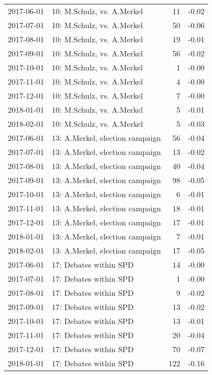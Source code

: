 \begin{adjustbox}{width=\textwidth}
\begin{tabular}{llrr}
  2017-06-01 & 10: M.Schulz, vs. A.Merkel &  11 & -0.02 \\ 
  2017-07-01 & 10: M.Schulz, vs. A.Merkel &  50 & -0.06 \\ 
  2017-08-01 & 10: M.Schulz, vs. A.Merkel &  19 & -0.01 \\ 
  2017-09-01 & 10: M.Schulz, vs. A.Merkel &  56 & -0.02 \\ 
  2017-10-01 & 10: M.Schulz, vs. A.Merkel &   1 & -0.00 \\ 
  2017-11-01 & 10: M.Schulz, vs. A.Merkel &   4 & -0.00 \\ 
  2017-12-01 & 10: M.Schulz, vs. A.Merkel &   7 & -0.00 \\ 
  2018-01-01 & 10: M.Schulz, vs. A.Merkel &   5 & -0.01 \\ 
  2018-02-01 & 10: M.Schulz, vs. A.Merkel &   5 & -0.03 \\ 
  2017-06-01 & 13: A.Merkel, election campaign &  56 & -0.04 \\ 
  2017-07-01 & 13: A.Merkel, election campaign &  13 & -0.02 \\ 
  2017-08-01 & 13: A.Merkel, election campaign &  40 & -0.04 \\ 
  2017-09-01 & 13: A.Merkel, election campaign &  98 & -0.05 \\ 
  2017-10-01 & 13: A.Merkel, election campaign &   6 & -0.01 \\ 
  2017-11-01 & 13: A.Merkel, election campaign &  18 & -0.01 \\ 
  2017-12-01 & 13: A.Merkel, election campaign &  17 & -0.01 \\ 
  2018-01-01 & 13: A.Merkel, election campaign &   7 & -0.01 \\ 
  2018-02-01 & 13: A.Merkel, election campaign &  17 & -0.05 \\ 
  2017-06-01 & 17: Debates within SPD &  14 & -0.00 \\ 
  2017-07-01 & 17: Debates within SPD &   1 & -0.00 \\ 
  2017-08-01 & 17: Debates within SPD &   9 & -0.02 \\ 
  2017-09-01 & 17: Debates within SPD &  13 & -0.02 \\ 
  2017-10-01 & 17: Debates within SPD &  13 & -0.01 \\ 
  2017-11-01 & 17: Debates within SPD &  20 & -0.04 \\ 
  2017-12-01 & 17: Debates within SPD &  70 & -0.07 \\ 
  2018-01-01 & 17: Debates within SPD & 122 & -0.16 \\ 

\end{tabular}
\end{adjustbox}
